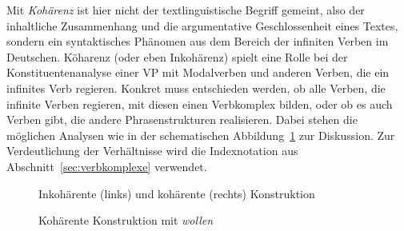 
Mit \textit{Kohärenz} ist hier nicht der textlinguistische Begriff gemeint, also der inhaltliche Zusammenhang und die argumentative Geschlossenheit eines Textes, sondern ein syntaktisches Phänomen aus dem Bereich der infiniten Verben im Deutschen.
Köharenz (oder eben Inkohärenz) spielt eine Rolle bei der Konstituentenanalyse einer VP mit Modalverben und anderen Verben, die ein infinites Verb regieren.
Konkret muss entschieden werden, ob alle Verben, die infinite Verben regieren, mit diesen einen Verbkomplex bilden, oder ob es auch Verben gibt, die andere Phrasenstrukturen realisieren.
Dabei stehen die möglichen Analysen wie in der schematischen Abbildung~\ref{fig:hypkohinkoh} zur Diskussion.
Zur Verdeutlichung der Verhältnisse wird die Indexnotation aus Abschnitt~\ref{sec:verbkomplexe} verwendet.

\begin{figure}[!htbp]
  \hspace{1cm}
  \vspace{0.5cm}
  \caption[Inkohärente und kohärente Konstruktion]{Inkohärente (links) und kohärente (rechts) Konstruktion}
  \label{fig:hypkohinkoh}
\end{figure}

\begin{figure}[!htbp]
  \caption{Kohärente Konstruktion mit \textit{wollen}}
  \label{fig:hypkoh}
\end{figure}

